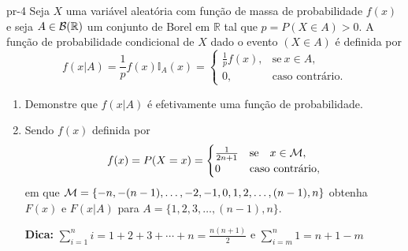 \begin{problema}{}{pr-4}
Seja   $X$ uma variável aleatória com função de massa de probabilidade $f(x)$ e seja $A\in {\cal B}(\mathbb{R})$ um conjunto de Borel em $\mathbb{R}$ tal que $p=P(X\in A)>0.$ A função de probabilidade condicional de $X$ dado o evento $(X\in A)$ é definida por 
$$
f(x|A) = \frac{1}{p}f(x)\mathbb{I}_A(x) = \begin{cases}
	\frac{1}{p}f(x),  & \text{se} \ x\in A, \\
	0, & \text{caso contrário.}
\end{cases}
$$
\begin{enumerate} 
	\item Demonstre que $f(x|A)$ é efetivamente uma função de probabilidade. 
	
	\item  Sendo $f(x)$  definida por
	$$
	f(x)=P(X=x) = \begin{cases}
		\frac{1}{2n+1} & \text{se} \quad x \in {\cal M}, \\
		0 & \text{caso contrário},
	\end{cases}
	$$ em que ${\cal M}=\{-n,-(n-1), \ldots, -2,-1, 0, 1, 2, \ldots, (n-1), n \}$ 
	obtenha  $F(x)$ e $F(x|A)$ para $A=\{1,2,3, \ldots , (n-1), n\}.$ 
	
{\bf Dica:} 
	$\sum^n_{i = 1} i = 1 + 2 + 3 +\cdots + n = \frac{n ( n + 1 )}{2}$ e $
	\sum^n_{i = m} 1 = n+1-m $
\end{enumerate}
\end{problema}




